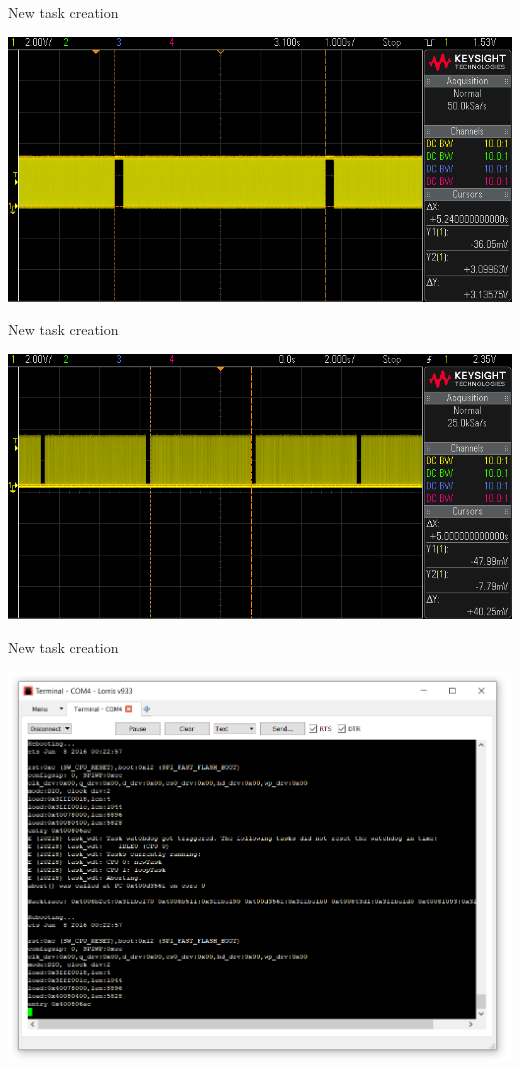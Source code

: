 \documentclass[
aspectratio=169,
]{beamer}
\begin{document}
\begin{frame}{New task creation}
	\begin{center}
		\includegraphics[width=.9\textwidth]{img/scope_1b.png}
	\end{center}
\end{frame}

\begin{frame}{New task creation}
	\begin{center}
		\includegraphics[width=.9\textwidth]{img/scope_1c.png}
	\end{center}
\end{frame}

\begin{frame}{New task creation}
	\begin{center}
		\includegraphics[width=.6\textwidth]{img/lorrisRebooting.png}
	\end{center}
\end{frame}
\end{document}
